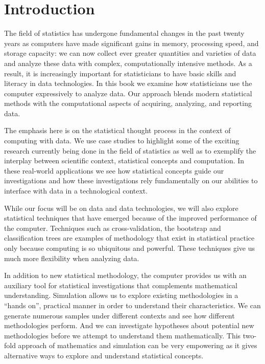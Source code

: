
\chapter{Introduction}
The field of statistics has undergone fundamental changes in the past
twenty years as computers have made significant gains in memory,
processing speed, and storage capacity: we can now collect ever
greater quantities and varieties of data and analyze these data with
complex, computationally intensive methods.  As a result, it is
increasingly important for statisticians to have basic skills and
literacy in data technologies.  In this book we examine how
statisticians use the computer expressively to analyze data.  Our
approach blends modern statistical methods with the computational
aspects of acquiring, analyzing, and reporting data.

The emphasis here is on the statistical thought process in the context
of computing with data.  We use case studies to highlight some of the
exciting research currently being done in the field of statistics as
well as to exemplify the interplay between scientific context,
statistical concepts and computation.  In these real-world
applications we see how statistical concepts guide our investigations
and how these investigations rely fundamentally on our abilities to
interface with data in a technological context.

While our focus will be on data and data technologies, we will also
explore statistical techniques that have emerged because of the
improved performance of the computer.  Techniques such as
cross-validation, the bootstrap and classification trees are examples of
methodology that exist in statistical practice only because computing
is so ubiquitous and powerful.  These techniques give us much more
flexibility when analyzing data.

In addition to new statistical methodology, the computer provides us
with an auxiliary tool for statistical investigations that complements
mathematical understanding.  Simulation allows us to explore
existing methodologies in a ``hands on'', practical manner in order  to
understand their characteristics.  We can generate numerous samples
under different contexts and see how different methodologies
perform.  And we can investigate hypotheses about potential new
methodologies before we attempt to understand them mathematically.
This two-fold approach of mathematics and simulation can be very
empowering as it gives alternative ways to explore and understand
statistical concepts.


